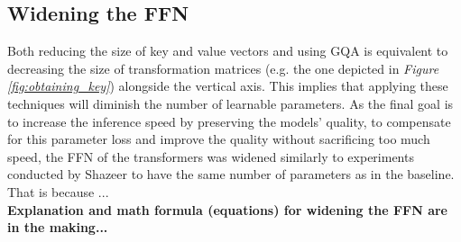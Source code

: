 \subsection{Widening the FFN}
Both reducing the size of key and value vectors and using GQA is equivalent to decreasing the size of transformation matrices (e.g. the one depicted in \textit{Figure \ref{fig:obtaining_key}}) alongside the vertical axis. This implies that applying these techniques will diminish the number of learnable parameters. As the final goal is to increase the inference speed by preserving the models' quality, to compensate for this parameter loss and improve the quality without sacrificing too much speed, the FFN of the transformers was widened similarly to experiments conducted by Shazeer \cite{shazeer_fast_2019} to have the same number of parameters as in the baseline. That is because ... \\
\textbf{Explanation and math formula (equations) for widening the FFN are in the making...}




